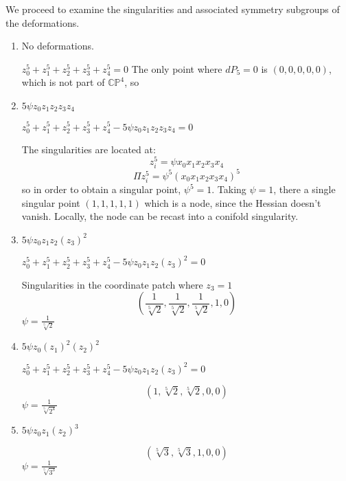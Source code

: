 We proceed to examine the singularities and associated symmetry subgroups of the deformations.
\begin{enumerate}
  \item No deformations.

    $z_0^5+z_1^5+z_2^5+z_3^5+z_4^5=0$ The only point where $dP_5=0$ is  $(0,0,0,0,0)$, which 
    is not part of $\mathbb{CP}^4$, so 

  \item $5\psi z_0z_1z_2z_3z_4$

    $z_0^5+z_1^5+z_2^5+z_3^5+z_4^5- 5\psi z_0z_1z_2z_3z_4=0$

    The singularities are located at:
    \begin{equation}
      z_i^5=\psi x_0x_1x_2x_3x_4
    \end{equation}
    \begin{equation}
      \Pi z_i^5=\psi^5 ( x_0x_1x_2x_3x_4 )^5
    \end{equation}
    so in order to obtain a singular point, $\psi^5=1$.
    Taking $\psi=1$, there a single singular point $(1,1,1,1,1)$ which is a node, since the Hessian doesn't vanish.
    Locally, the node can be recast into a conifold singularity.

  \item $5\psi z_0z_1z_2(z_3)^2$

    $z_0^5+z_1^5+z_2^5+z_3^5+z_4^5- 5\psi z_0z_1z_2(z_3)^2=0$

    Singularities in the coordinate patch where $z_3=1$
    \begin{equation}
      (\frac{1}{\sqrt[5]{2}}, \frac{1}{\sqrt[5]{2}}, \frac{1}{\sqrt[5]{2}}, 1,0) 
    \end{equation}
    $\psi=\frac{1}{\sqrt[5]{2}}$

  \item $5\psi z_0(z_1)^2(z_2)^2$

    $z_0^5+z_1^5+z_2^5+z_3^5+z_4^5- 5\psi z_0z_1z_2(z_3)^2=0$

    \begin{equation}
      (1, \sqrt[5]{2}, \sqrt[5]{2}, 0, 0)
    \end{equation}
    $\psi=\frac{1}{\sqrt[5]{2^4}}$

  \item $5\psi z_0z_1(z_2)^3$

    \begin{equation}
      (\sqrt[5]{3}, \sqrt[5]{3},1, 0, 0)
    \end{equation}
    $\psi=\frac{1}{\sqrt[5]{3^3}}$


\end{enumerate}
